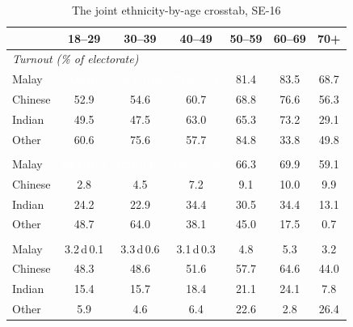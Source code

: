 \begin{table}[!htb]
\caption{The joint ethnicity-by-age crosstab, SE-16}
\label{tab:joint}
\par\vspace{3pt}
\footnotesize\setlength{\tabcolsep}{3.2pt}
\begin{tabular}{lcccccc}
\toprule
 & 18--29 & 30--39 & 40--49 & 50--59 & 60--69 & 70+ \\
\midrule
\multicolumn{7}{l}{\textit{Turnout (\% of electorate)}}\\[1pt]
\quad Malay & \cellcolor[HTML]{2171B5}\textcolor{white}{74.6\,{\tiny\textsf{d}\,}0.9} & \cellcolor[HTML]{2575B7}\textcolor{white}{73.1\,{\tiny\textsf{d}\,}0.8} & \cellcolor[HTML]{2373B6}\textcolor{white}{74.0\,{\tiny\textsf{d}\,}1.4} & 81.4 & 83.5 & 68.7 \\
\quad Chinese & 52.9 & 54.6 & 60.7 & 68.8 & 76.6 & 56.3 \\
\quad Indian & 49.5 & 47.5 & 63.0 & 65.3 & 73.2 & 29.1 \\
\quad Other & 60.6 & 75.6 & 57.7 & 84.8 & 33.8 & 49.8 \\
\addlinespace[3pt]
\multicolumn{7}{l}{\textit{BN (\% of electorate)}}\\[1pt]
\quad Malay & \cellcolor[HTML]{3C8CC3}\textcolor{white}{64.8\,{\tiny\textsf{d}\,}0.3} & \cellcolor[HTML]{4191C6}\textcolor{white}{62.6\,{\tiny\textsf{d}\,}1.7} & \cellcolor[HTML]{4292C6}\textcolor{white}{62.1\,{\tiny\textsf{d}\,}1.5} & 66.3 & 69.9 & 59.1 \\
\quad Chinese & 2.8 & 4.5 & 7.2 & 9.1 & 10.0 & 9.9 \\
\quad Indian & 24.2 & 22.9 & 34.4 & 30.5 & 34.4 & 13.1 \\
\quad Other & 48.7 & 64.0 & 38.1 & 45.0 & 17.5 & 0.7 \\
\addlinespace[3pt]
\multicolumn{7}{l}{\textit{PH (\% of electorate)}}\\[1pt]
\quad Malay & \cellcolor[HTML]{F1F7FD}3.2\,{\tiny\textsf{d}\,}0.1 & \cellcolor[HTML]{F1F7FD}3.3\,{\tiny\textsf{d}\,}0.6 & \cellcolor[HTML]{F2F7FD}3.1\,{\tiny\textsf{d}\,}0.3 & 4.8 & 5.3 & 3.2 \\
\quad Chinese & 48.3 & 48.6 & 51.6 & 57.7 & 64.6 & 44.0 \\
\quad Indian & 15.4 & 15.7 & 18.4 & 21.1 & 24.1 & 7.8 \\
\quad Other & 5.9 & 4.6 & 6.4 & 22.6 & 2.8 & 26.4 \\

\end{tabular}
\end{table}
